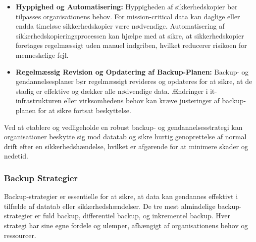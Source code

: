 \begin{itemize}
	\item \textbf{Hyppighed og Automatisering:} Hyppigheden af sikkerhedskopier bør tilpasses organisationens behov. For mission-critical data kan daglige eller endda timeløse sikkerhedskopier være nødvendige. Automatisering af sikkerhedskopieringsprocessen kan hjælpe med at sikre, at sikkerhedskopier foretages regelmæssigt uden manuel indgriben, hvilket reducerer risikoen for menneskelige fejl.
	
	\item \textbf{Regelmæssig Revision og Opdatering af Backup-Planen:} Backup- og gendannelsesplaner bør regelmæssigt revideres og opdateres for at sikre, at de stadig er effektive og dækker alle nødvendige data. Ændringer i it-infrastrukturen eller virksomhedens behov kan kræve justeringer af backup-planen for at sikre fortsat beskyttelse.
	
\end{itemize}
\noindent
Ved at etablere og vedligeholde en robust backup- og gendannelsesstrategi kan organisationer beskytte sig mod datatab og sikre hurtig genoprettelse af normal drift efter en sikkerhedshændelse, hvilket er afgørende for at minimere skader og nedetid.


\subsubsection{Backup Strategier}
Backup-strategier er essentielle for at sikre, at data kan gendannes effektivt i tilfælde af datatab eller sikkerhedshændelser. De tre mest almindelige backup-strategier er fuld backup, differentiel backup, og inkrementel backup. Hver strategi har sine egne fordele og ulemper, afhængigt af organisationens behov og ressourcer.

